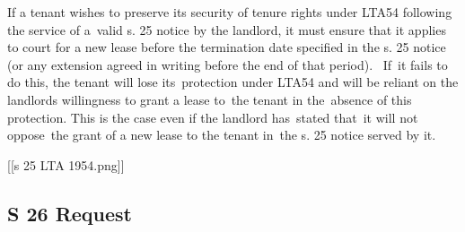 \documentclass[
]{article}
\newenvironment{Shaded}{}{}
\newcommand{\NormalTok}[1]{#1}
\begin{document}
\begin{Shaded}
\begin{Highlighting}[]
\NormalTok{If a tenant wishes to preserve its security of tenure rights under LTA54 following the service of a valid s. 25 notice by the landlord, it must ensure that it applies to court for a new lease before the termination date specified in the s. 25 notice (or any extension agreed in writing before the end of that period).  If it fails to do this, the tenant will lose its protection under LTA54 and will be reliant on the landlord\textquotesingle{}s willingness to grant a lease to the tenant in the absence of this protection. This is the case even if the landlord has stated that it will not oppose the grant of a new lease to the tenant in the s. 25 notice served by it.}
\end{Highlighting}
\end{Shaded}

{[}{[}s 25 LTA 1954.png{]}{]}

\hypertarget{s-26-request}{%
\subsection{S 26 Request}\label{s-26-request}}
\end{document}
